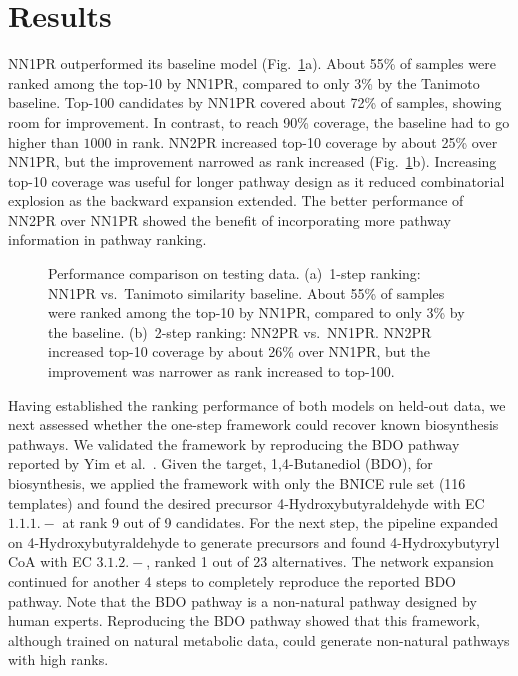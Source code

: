 \documentclass{article}
\begin{document}
%
\section{Results} \label{sec:results}
NN1PR outperformed its baseline model (Fig.~\ref{fig:model_performance}a).
About 55\% of samples were ranked among the top-10 by NN1PR, compared to only 3\% by the Tanimoto baseline. Top-100 candidates by NN1PR covered about 72\% of samples, showing room for improvement.
In contrast, to reach 90\% coverage, the baseline had to go higher than $1000$ in rank.
NN2PR increased top-10 coverage by about 25\% over NN1PR, but the improvement narrowed as rank increased (Fig.~\ref{fig:model_performance}b).
Increasing top-10 coverage was useful for longer pathway design as it reduced combinatorial explosion as the backward expansion extended.
The better performance of NN2PR over NN1PR showed the benefit of incorporating more pathway information in pathway ranking.

\begin{figure}
\centering
    
    \caption{Performance comparison on testing data. (a)~1-step ranking: NN1PR vs.\ Tanimoto similarity baseline. About 55\% of samples were ranked among the top-10 by NN1PR, compared to only 3\% by the baseline. (b)~2-step ranking: NN2PR vs.\ NN1PR. NN2PR increased top-10 coverage by about 26\% over NN1PR, but the improvement was narrower as rank increased to top-100.}
    \label{fig:model_performance}
\end{figure}

Having established the ranking performance of both models on held-out data, we next assessed whether the one-step framework could recover known biosynthesis pathways.
We validated the framework by reproducing the BDO pathway reported by Yim et al.\ \citep{yim2011metabolic}.
Given the target, 1,4-Butanediol (BDO), for biosynthesis, we applied the framework with only the BNICE rule set (116 templates) \citep{henry2010discovery, duigou2019retrorules} and found the desired precursor 4-Hydroxybutyraldehyde with EC $1.1.1.-$ at rank 9 out of 9 candidates.
For the next step, the pipeline expanded on 4-Hydroxybutyraldehyde to generate precursors and found 4-Hydroxybutyryl CoA with EC $3.1.2.-$, ranked 1 out of 23 alternatives.
The network expansion continued for another 4 steps to completely reproduce the reported BDO pathway.
Note that the BDO pathway is a non-natural pathway designed by human experts.
Reproducing the BDO pathway showed that this framework, although trained on natural metabolic data, could generate non-natural pathways with high ranks.
\end{document}
